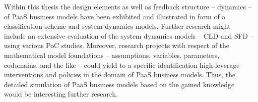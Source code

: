 Within this thesis the design elements as well as feedback structure -- dynamics -- of \ac{PaaS} business models have been exhibited and illustrated in form of a classification scheme and system dynamics models. Further research might include an extensive evaluation of the system dynamics models -- \ac{CLD} and \ac{SFD} -- using various \ac{PoC} studies. Moreover, research projects with respect of the mathematical model foundations -- assumptions, variables, parameters, codomains, and the like -- could yield to a specific identification high-leverage interventions and policies in the domain of \ac{PaaS} business models. Thus, the detailed simulation of \ac{PaaS} business models based on the gained knowledge would be interesting further research.
